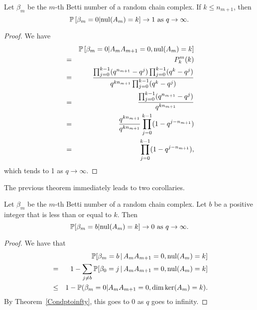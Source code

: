 \begin{theorem}\label{Condptoinfty}
Let $\beta_m$ be the $m$-th Betti number of a random chain complex.  If $k\leq n_{m+1}$, then
\[
\mathbb{P}\left[\beta_m=0| \mathrm{nul}(A_{m}) = k \right] \to 1 \textrm{ as } q\to\infty.
\]
\end{theorem}

\begin{proof}
We have
	\begin{eqnarray*}
	&&\mathbb{P}\left[\beta_m = 0|A_{m}A_{m+1} = 0, \mathrm{nul}(A_{m}) = k \right]\\ 
    &=& P^m_k(k)\\
    &=& \frac{\prod_{j=0}^{k-1}(q^{n_{m+1}}-q^{j})
		\prod_{j=0}^{k-1}(q^k - q^j )}
		{q^{kn_{m+1}} \prod_{j=0}^{k-1} (q^k-q^j)}\\
		&=& \frac{\prod_{j=0}^{k-1}(q^{n_{m+1}} - q^j)}
		{q^{kn_{m+1}}} \\
		&=& \frac{q^{kn_{m+1}}}{q^{kn_{m+1}}}\prod_{j=0}^{k-1}(1-q^{j-n_{m+1}})\\
		&=& \prod_{j=0}^{k-1} (1-q^{j-n_{m+1}}),
	\end{eqnarray*}
which tends to 1 as $q\to\infty$.  
\end{proof}

The previous theorem immediately leads to two corollaries.  

\begin{corollary}\label{condtozero}
Let $\beta_m$ be the $m$-th Betti number of a random chain complex. Let $b$ be a positive integer that is less than or equal to $k$. Then 
\[
\mathbb{P}[\beta_m = b| \mathrm{nul}(A_{m}) = k ] \to 0 \textrm{ as } q\to\infty.
\]
\end{corollary}
\begin{proof}
We have that
	\begin{eqnarray*}
	&&\mathbb{P}[\beta_m = b \,|\, A_{m}A_{m+1} = 0, \mathrm{nul}(A_{m}) = k ]\\
    &=& 1 - \sum_{j\neq b}\mathbb{P}[\beta_0 = j \,|\, A_{m}A_{m+1} = 0, \mathrm{nul}(A_{m}) = k ]\\
    &\leq& 1 - \mathbb{P}(\beta_m = 0|A_{m}A_{m+1} = 0, \dim\ker(A_{m}) = k ).
	\end{eqnarray*}
By Theorem~\ref{Condptoinfty}, this goes to $0$ as $q$ goes to infinity.
\end{proof}

